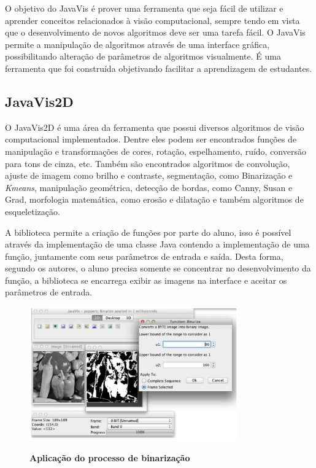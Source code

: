 \documentclass[
	12pt,				%
	oneside,			%
	a4paper,			%
	english,			%
	french,				%
	spanish,			%
	brazil,				%
	]{abntex2}
\begin{document}
O objetivo do JavaVis é prover uma ferramenta que seja fácil de utilizar e aprender conceitos relacionados à visão computacional, sempre tendo em vista que o desenvolvimento de novos algoritmos deve ser uma tarefa fácil. O JavaVis permite a manipulação de algoritmos através de uma interface gráfica, possibilitando alteração de parâmetros de algoritmos visualmente. É uma ferramenta que foi construída objetivando facilitar a aprendizagem de estudantes.

\subsection{JavaVis2D}

O JavaVis2D é uma área da ferramenta que possui diversos algoritmos de visão computacional implementados. Dentre eles podem ser encontrados funções de manipulação e transformações de cores,  rotação, espelhamento, ruído, conversão para tons de cinza, etc. Também são encontrados algoritmos de convolução, ajuste de imagem como brilho e contraste, segmentação, como Binarização e \textit{Kmeans}, manipulação geométrica, detecção de bordas, como Canny, Susan e Grad, morfologia matemática, como erosão e dilatação e também algoritmos de esqueletização. 

A biblioteca permite a criação de funções por parte do aluno, isso é possível através da implementação de uma classe Java contendo a implementação de uma função, juntamente com seus parâmetros de entrada e saída. Desta forma, segundo os autores, o aluno precisa somente se concentrar no desenvolvimento da função, a biblioteca se encarrega exibir as imagens na interface e aceitar os parâmetros de entrada.

\begin{figure}[ht]
\centering
\caption{\textbf{Aplicação do processo de binarização }}
\includegraphics[width=0.8\textwidth]{imagens/javavis_2d.png}
\label{fig:javavis_2d}
\end{figure}
\end{document}
